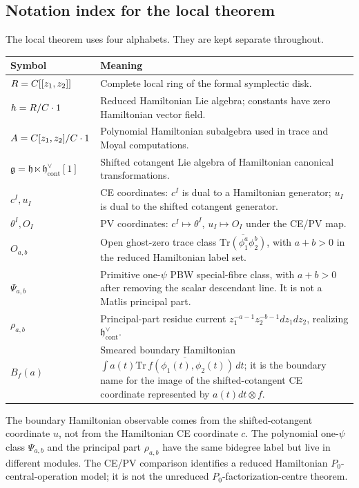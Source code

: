 \documentclass[11pt]{memoir}
\begin{document}
\subsection{Notation index for the local theorem}\label{ssec:intro-notation-index}

The local theorem uses four alphabets. They are kept separate throughout.
\begin{center}
\begin{tabular}{@{}p{}p{}@{}}
\hline
\textbf{Symbol} & \textbf{Meaning}\\
\hline
$R=C[[z_1,z_2]]$ &
Complete local ring of the formal symplectic disk.\\
$h=R/C\cdot1$ &
Reduced Hamiltonian Lie algebra; constants have zero Hamiltonian vector
field.\\
$A=C[z_1,z_2]/C\cdot1$ &
Polynomial Hamiltonian subalgebra used in trace and Moyal computations.\\
$\mathfrak g=\mathfrak h\ltimes\mathfrak h^\vee_{\mathrm{cont}}[1]$ &
Shifted cotangent Lie algebra of Hamiltonian canonical transformations.\\
$c^I,u_I$ &
CE coordinates: $c^I$ is dual to a Hamiltonian generator; $u_I$ is dual
to the shifted cotangent generator.\\
$\theta^I,O_I$ &
PV coordinates: $c^I\mapsto\theta^I$, $u_I\mapsto O_I$ under the
CE/PV map.\\
$O_{a,b}$ &
Open ghost-zero trace class
$\overline{\mathrm{Tr}(\phi_1^a\phi_2^b)}$, with \(a+b>0\) in the
reduced Hamiltonian label set.\\
$\Psi_{a,b}$ &
Primitive one-$\psi$ PBW special-fibre class, with \(a+b>0\) after
removing the scalar descendant line. It is not a Matlis principal part.\\
$\rho_{a,b}$ &
Principal-part residue current
$z_1^{-a-1}z_2^{-b-1}dz_1dz_2$, realizing
$\mathfrak h^\vee_{\mathrm{cont}}$.\\
$B_f(a)$ &
Smeared boundary Hamiltonian
$\int a(t)\overline{\mathrm{Tr}\,f(\phi_1(t),\phi_2(t))}\,dt$; it is the
boundary name for the image of the shifted-cotangent CE coordinate represented
by \(a(t)dt\otimes f\).\\
\hline
\end{tabular}
\end{center}

\begin{rmk}\label{rmk:intro-symbol-separation}
  The boundary Hamiltonian observable comes from the shifted-cotangent
  coordinate \(u\), not from the Hamiltonian CE coordinate \(c\). The
  polynomial one-\(\psi\) class \(\Psi_{a,b}\) and the principal part
  \(\rho_{a,b}\) have the same bidegree label but live in different
  modules. The CE/PV comparison identifies a reduced Hamiltonian
  \(P_0\)-central-operation model; it is not the unreduced
  \(P_0\)-factorization-centre theorem.
\end{rmk}
\end{document}

